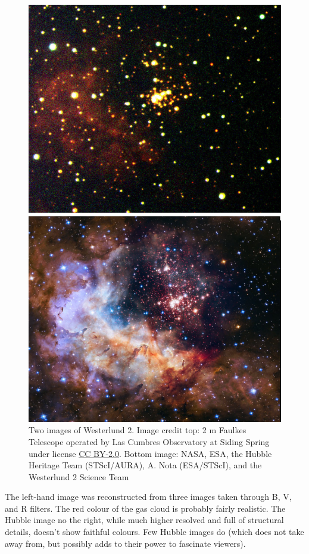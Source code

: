 \documentclass[twocolumn,apj]{openjournal}
\begin{document}
\begin{figure}[htbp]
\begin{center}
\includegraphics[width=\linewidth]{westlund-comparison.jpg}
\caption{Two images of Westerlund 2. Image credit top: 2 m Faulkes Telescope operated by Las Cumbres Observatory at Siding Spring under license \href{https://creativecommons.org/licenses/by-nc/2.0/deed.en_US}{CC BY-2.0}. Bottom image: NASA, ESA, the Hubble Heritage Team (STScI/AURA), A. Nota (ESA/STScI), and the Westerlund 2 Science Team
}
\label{WesterlundComparison}
\end{center}
\end{figure}
The left-hand image was reconstructed from three images taken through B, V, and R filters. The red colour of the gas cloud is probably fairly realistic. The Hubble image no the right, while much higher resolved and full of structural details, doesn't show faithful colours. Few Hubble images do (which does not take away from, but possibly adds to their power to fascinate viewers).
\end{document}
